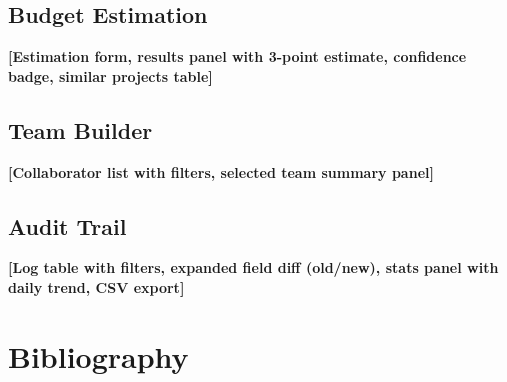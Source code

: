 \documentclass[12pt,a4paper]{report}
\begin{document}
\section*{Budget Estimation}\label{annex:Budget Estimation}
\begin{placeholder}\textbf{[Estimation form, results panel with 3-point estimate, confidence badge, similar projects table]}\end{placeholder}

\section*{Team Builder}\label{annex:Team Builder}
\begin{placeholder}\textbf{[Collaborator list with filters, selected team summary panel]}\end{placeholder}

\section*{Audit Trail}\label{annex:Audit Trail}
\begin{placeholder}\textbf{[Log table with filters, expanded field diff (old/new), stats panel with daily trend, CSV export]}\end{placeholder}

\chapter*{Bibliography}
\thispagestyle{plain}
\end{document}
